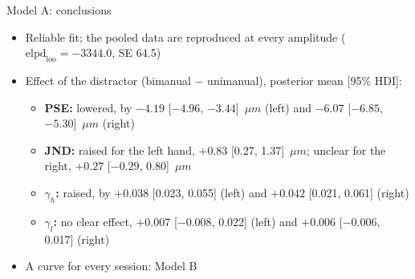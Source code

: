 \begin{frame}{Model A: conclusions}
  \begin{itemize}
    \item Reliable fit; the pooled data are reproduced at every amplitude
          ($\text{elpd}_\text{loo} = -3344.0$, SE 64.5)
    \item Effect of the distractor (bimanual $-$ unimanual), posterior mean [95\% HDI]:
    \begin{itemize}
      \item \textbf{PSE:} lowered, by $-4.19$ [$-4.96$, $-3.44$]~$\mu m$ (left) and
            $-6.07$ [$-6.85$, $-5.30$]~$\mu m$ (right)
      \item \textbf{JND:} raised for the left hand, $+0.83$ [0.27, 1.37]~$\mu m$; unclear for
            the right, $+0.27$ [$-0.29$, 0.80]~$\mu m$
      \item \textbf{\boldmath$\gamma_h$:} raised, by $+0.038$ [0.023, 0.055] (left) and
            $+0.042$ [0.021, 0.061] (right)
      \item \textbf{\boldmath$\gamma_l$:} no clear effect, $+0.007$ [$-0.008$, 0.022] (left) and
            $+0.006$ [$-0.006$, 0.017] (right)
    \end{itemize}
    \item[$\Rightarrow$] A curve for every session: Model B
  \end{itemize}
\end{frame}
